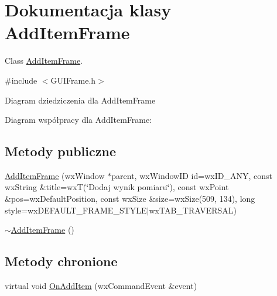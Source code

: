 \hypertarget{class_add_item_frame}{\section{Dokumentacja klasy Add\+Item\+Frame}
\label{class_add_item_frame}
}


Class \hyperlink{class_add_item_frame}{Add\+Item\+Frame}.  




{\ttfamily \#include $<$G\+U\+I\+Frame.\+h$>$}



Diagram dziedziczenia dla Add\+Item\+Frame


Diagram współpracy dla Add\+Item\+Frame\+:
\subsection*{Metody publiczne}
\begin{DoxyCompactItemize}
\item 
\hyperlink{class_add_item_frame_a86096e43c925d13299894b24972bc569}{Add\+Item\+Frame} (wx\+Window $\ast$parent, wx\+Window\+I\+D id=wx\+I\+D\+\_\+\+A\+N\+Y, const wx\+String \&title=wx\+T(\char`\"{}Dodaj wynik pomiaru\char`\"{}), const wx\+Point \&pos=wx\+Default\+Position, const wx\+Size \&size=wx\+Size(509, 134), long style=wx\+D\+E\+F\+A\+U\+L\+T\+\_\+\+F\+R\+A\+M\+E\+\_\+\+S\+T\+Y\+L\+E$\vert$wx\+T\+A\+B\+\_\+\+T\+R\+A\+V\+E\+R\+S\+A\+L)
\item 
\hyperlink{class_add_item_frame_ad1a92909cf7b8c9300e9ac1f69d0813f}{$\sim$\+Add\+Item\+Frame} ()
\end{DoxyCompactItemize}
\subsection*{Metody chronione}
\begin{DoxyCompactItemize}
\item 
virtual void \hyperlink{class_add_item_frame_abd99995dfff0641b38134c4ab71be35e}{On\+Add\+Item} (wx\+Command\+Event \&event)
\end{DoxyCompactItemize}
